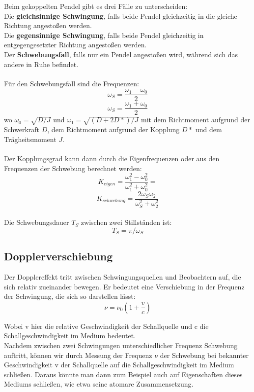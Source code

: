 \documentclass{article}
\begin{document}
Beim gekoppelten Pendel gibt es drei Fälle zu unterscheiden:\\
Die \textbf{gleichsinnige Schwingung}, falls beide Pendel gleichzeitig in die gleiche Richtung angestoßen werden.\\
Die \textbf{gegensinnige Schwingung}, falls beide Pendel gleichzeitig in entgegengesetzter Richtung angestoßen werden.\\
Der \textbf{Schwebungsfall}, falls nur ein Pendel angestoßen wird, während sich das andere in Ruhe befindet.\\
\\
Für den Schwebungsfall sind die Frequenzen:
$$\omega_S=\frac{\omega_1 - \omega_0}{2}$$
$$\omega_S=\frac{\omega_1 + \omega_0}{2}$$
wo $\omega_0=\sqrt{D/J}$ und $\omega_1=\sqrt{(D+2D*)/J}$ mit dem Richtmoment aufgrund der Schwerkraft $D$, dem Richtmoment aufgrund der Kopplung $D*$ und dem Trägheitsmoment $J$.\\
\\
Der Kopplungsgrad kann dann durch die Eigenfrequenzen oder aus den Frequenzen der Schwebung berechnet werden:
$$K_{eigen}=\frac{\omega_1^2-\omega_0^2}{\omega_1^2+\omega_0^2}=$$
$$K_{schwebung}=\frac{2\omega_S \omega_2}{\omega_S^2 + \omega_2^2}$$
\\
Die Schwebungsdauer $T_S$ zwischen zwei Stillständen ist:
$$T_S=\pi/\omega_S$$

\subsection{Dopplerverschiebung}
Der Dopplereffekt tritt zwischen Schwingungsquellen und Beobachtern auf, die sich relativ zueinander bewegen. Er bedeutet eine Verschiebung in der Frequenz der Schwingung, die sich so darstellen lässt:\\

\begin{equation}
\label{Dopplereffekt}
\nu = \nu_0(1+ \frac{v}{c})
\end{equation}

Wobei v hier die relative Geschwindigkeit der Schallquelle und c die Schallgeschwindigkeit im Medium bedeutet. \\

Nachdem zwischen zwei Schwingungen unterschiedlicher Frequenz Schwebung auftritt, können wir durch Messung der Frequenz $\nu$ der Schwebung bei bekannter Geschwindigkeit v der Schallquelle auf die Schallgeschwindigkeit im Medium schließen. Daraus könnte man dann zum Beispiel auch auf Eigenschaften dieses Mediums schließen, wie etwa seine atomare Zusammensetzung.\\
\end{document}
